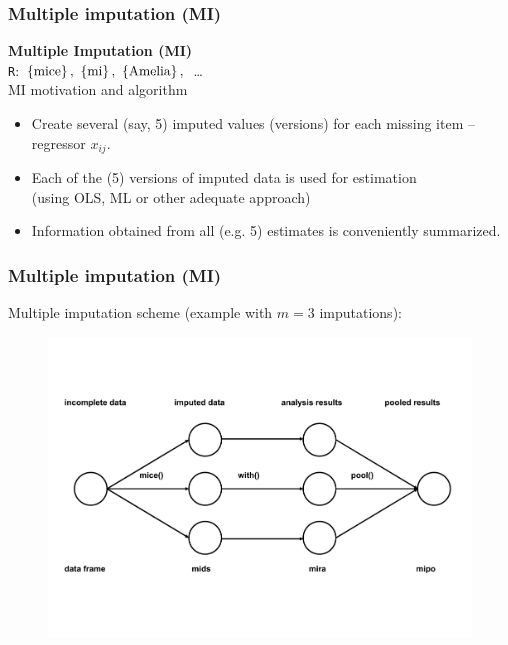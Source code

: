 \documentclass{beamer}
\begin{document}
\begin{frame}
\frametitle{Multiple imputation (MI)}
\textbf{Multiple Imputation (MI) }\\
\texttt{R}: $\left\lbrace \textnormal{mice}  \right\rbrace , \,\, \left\lbrace \textnormal{mi}  \right\rbrace, \,\, \left\lbrace \textnormal{Amelia}  \right\rbrace, \, $ \dots\\
  \vspace{0.5cm}
MI motivation and algorithm\\
  \vspace{0.2cm}
  \begin{itemize}
  \item Create several (say, 5) imputed values (versions) for each missing item -- regressor $x_{ij}$.
  \medskip
  \item Each of the (5) versions of imputed data is used for estimation \\(using OLS, ML or other adequate approach)
  \medskip
  \item Information obtained from all (e.g. 5) estimates is conveniently summarized.
 \end{itemize}
 \end{frame}
\begin{frame}
\frametitle{Multiple imputation (MI)}
Multiple imputation scheme (example with $m=3$ imputations):\\
\vspace{-1cm}
\begin{figure}
\includegraphics[width=1\linewidth]{IMG/mice_scheme.pdf}
\end{figure}
 \end{frame}
\end{document}
